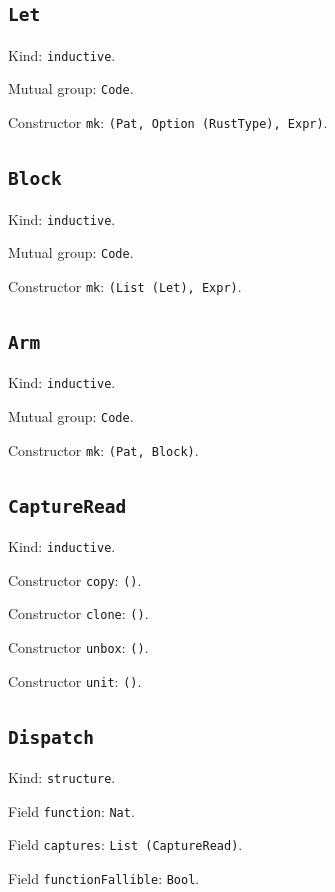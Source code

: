 \documentclass[11pt]{article}
\begin{document}
\subsection*{\texttt{Let}}
\noindent Kind: \texttt{inductive}.\par
\noindent Mutual group: \texttt{Code}.\par
\noindent Constructor \texttt{mk}: \texttt{(Pat, Option (RustType), Expr)}.\par
\subsection*{\texttt{Block}}
\noindent Kind: \texttt{inductive}.\par
\noindent Mutual group: \texttt{Code}.\par
\noindent Constructor \texttt{mk}: \texttt{(List (Let), Expr)}.\par
\subsection*{\texttt{Arm}}
\noindent Kind: \texttt{inductive}.\par
\noindent Mutual group: \texttt{Code}.\par
\noindent Constructor \texttt{mk}: \texttt{(Pat, Block)}.\par
\subsection*{\texttt{CaptureRead}}
\noindent Kind: \texttt{inductive}.\par
\noindent Constructor \texttt{copy}: \texttt{()}.\par
\noindent Constructor \texttt{clone}: \texttt{()}.\par
\noindent Constructor \texttt{unbox}: \texttt{()}.\par
\noindent Constructor \texttt{unit}: \texttt{()}.\par
\subsection*{\texttt{Dispatch}}
\noindent Kind: \texttt{structure}.\par
\noindent Field \texttt{function}: \texttt{Nat}.\par
\noindent Field \texttt{captures}: \texttt{List (CaptureRead)}.\par
\noindent Field \texttt{functionFallible}: \texttt{Bool}.\par
\end{document}
